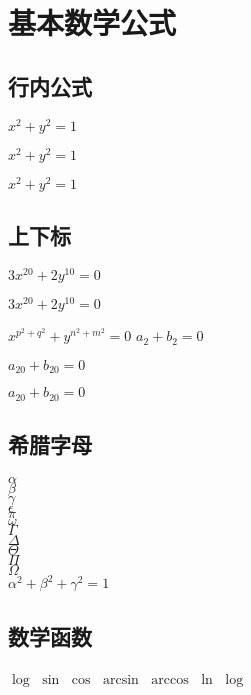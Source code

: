 \documentclass[]{ctexart}
\begin{document}
 	
	\section{基本数学公式}
	
	\subsection{行内公式}
	$ x^2+y^2=1 $
	
	\( x^2+y^2=1 \)
	
	\begin{math}
		x^2+y^2=1
	\end{math}
 	
 	\subsection{上下标}
 	$ 3x^20 + 2y^10 =0 $ 
 	
 	$ 3x^{20} + 2y^{10} =0 $
 	
 	$ x^{p^2+q^2}+y^{n^2+m^2}=0 $
 	$ a_2 + b_2 =0 $
 	
 	$ a_20 + b_20 =0 $
 	
 	$ a_{20} + b_{20} =0 $
 	
 	\subsection{希腊字母}
 	$ \alpha $		\\
 	$ \beta $		\\
 	$ \gamma $		\\
 	$ \epsilon $	\\
 	$ \pi $			\\
 	$ \omega $		\\
 	$ \Gamma $		\\
 	$ \Delta $		\\
 	$ \Theta $		\\
 	$ \Pi $			\\
 	$ \Omega $		\\
 	
 	$ \alpha^2 + \beta^2 + \gamma^2 =1 $
 	
 	\subsection{数学函数}
 	$ \log $
 	$ \sin $
 	$ \cos $
 	$ \arcsin $
 	$ \arccos $
 	$ \ln $
 	$ \log $
 	
\end{document}
